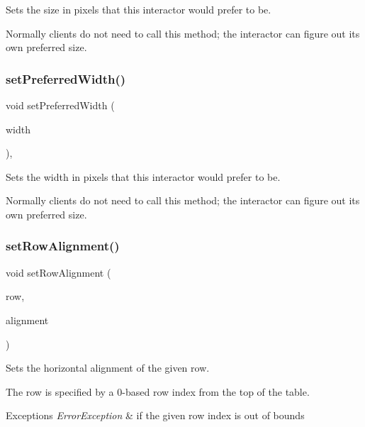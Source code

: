 Sets the size in pixels that this interactor would prefer to be. 

Normally clients do not need to call this method; the interactor can figure out its own preferred size. \mbox{\label{classsgl_1_1GInteractor_a3db429ab2fa52efd187eec0ed8cdd9f2}} 
\subsubsection{\texorpdfstring{set\+Preferred\+Width()}{setPreferredWidth()}}
{\footnotesize\ttfamily void set\+Preferred\+Width (\begin{DoxyParamCaption}\item[{double}]{width }\end{DoxyParamCaption})\hspace{0.3cm}{\ttfamily [virtual]}, {\ttfamily [inherited]}}



Sets the width in pixels that this interactor would prefer to be. 

Normally clients do not need to call this method; the interactor can figure out its own preferred size. \mbox{\label{classsgl_1_1GTable_ac6a47ba68c502b7d8dc776beeeffccc3}} 
\subsubsection{\texorpdfstring{set\+Row\+Alignment()}{setRowAlignment()}}
{\footnotesize\ttfamily void set\+Row\+Alignment (\begin{DoxyParamCaption}\item[{int}]{row,  }\item[{\mbox{\hyperlink{namespacesgl_aa00e70829e72ff16addc4d9f06fe3bc5}{Horizontal\+Alignment}}}]{alignment }\end{DoxyParamCaption})\hspace{0.3cm}{\ttfamily [virtual]}}



Sets the horizontal alignment of the given row. 

The row is specified by a 0-\/based row index from the top of the table. 
\begin{DoxyExceptions}{Exceptions}
{\em Error\+Exception} & if the given row index is out of bounds \\
\hline
\end{DoxyExceptions}
\mbox{\label{classsgl_1_1GTable_a85ee577aabd189ed64a5c9f66ba61fd2}} 
